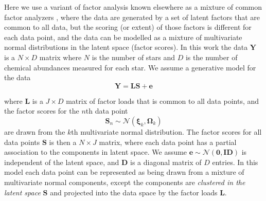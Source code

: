 \documentclass[twocolumn]{aastex62}
\newcommand{\vect}[1]{\boldsymbol{\mathbf{#1}}}
\renewcommand{\vec}[1]{\vect{#1}}
\newcommand{\data}{\textbf{Y}}
\newcommand{\vecdata}{\vec\data}
\newcommand{\eye}{\textbf{I}}
\newcommand{\factorloads}{\textbf{L}}
\newcommand{\factorscores}{\textbf{S}}
\newcommand{\specificvariance}{\vec{D}}
\newcommand{\NumData}{N}
\newcommand{\NumDimensions}{D}
\newcommand{\numdata}{n}
\newcommand{\NumLatentFactors}{J}
\newcommand{\numcomponents}{k}
\begin{document}
Here we use a variant of factor analysis known elsewhere as a mixture of common 
factor analyzers \citep{Baek:2010}, where the data are generated by a set of 
latent factors that are common to all data, but the scoring (or extent) of those
factors is different for each data point, and the data can be modelled as a
mixture of multivariate normal distributions in the latent space (factor scores).
In this work the data $\vecdata$ is a 
$\NumData \times \NumDimensions$ matrix where $\NumData$ is the number of 
stars and $\NumDimensions$ is the number of chemical abundances measured 
for each star. We assume a generative model for the data 
\begin{equation}
	\vecdata = \factorloads\factorscores + \vec{e}
	\label{eq:generative-model}
\end{equation}

\noindent{}where $\factorloads$ is a $\NumLatentFactors \times \NumDimensions$ 
matrix of factor loads that is common to all data points, and the factor scores 
for the $\numdata$th data point
\begin{equation}
	\factorscores_\numdata \sim \mathcal{N}(\vec\xi_\numcomponents, \vec\Omega_\numcomponents)
\end{equation}
\noindent{}are drawn from the $\numcomponents$th multivariate normal distribution.
The factor scores for all data points $\factorscores$ is then a 
$\NumData \times \NumLatentFactors$ matrix, where each data point has a partial
association to the components in latent space. 
We assume $\vec{e} \sim \mathcal{N}\left(\vec{0}, \eye\specificvariance\right)$
is independent of the latent space, and $\specificvariance$ is a
diagonal matrix of $\NumDimensions$ entries. 
In this model each data point can be represented as being drawn
from a mixture of multivariate normal components, except the components
are \emph{clustered in the latent space} $\factorscores$ and projected
into the data space by the factor loads $\factorloads$. 
\end{document}
